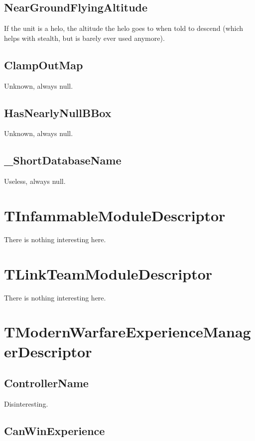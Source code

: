 \documentclass{article}
\begin{document}
\subsection{NearGroundFlyingAltitude}

If the unit is a helo, the altitude the helo goes to when told to descend (which helps with stealth, but is barely ever used anymore).

\subsection{ClampOutMap}

Unknown, always null.

\subsection{HasNearlyNullBBox}

Unknown, always null.

\subsection{\_ShortDatabaseName}

Useless, always null.

\section{TInfammableModuleDescriptor}

There is nothing interesting here.

\section{TLinkTeamModuleDescriptor}

There is nothing interesting here.

\section{TModernWarfareExperienceManagerDescriptor}

\subsection{ControllerName}

Disinteresting.

\subsection{CanWinExperience}
\end{document}
